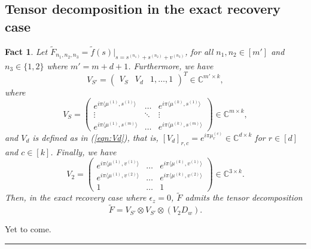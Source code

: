 \documentclass[11pt]{article}
\newtheorem{fact}[theorem]{Fact}
\newenvironment{proof}{{\bf Proof\quad}}{\hfill\rule{2mm}{2mm}}
\begin{document}
\subsection{Tensor decomposition in the exact recovery case}
\begin{fact}
    Let $\tilde{F}_{n_1,n_2,n_3}=\tilde{f}(s)\big|_{s=s^{(n_1)}+s^{(n_2)}+v^{(n_3)}}$, for all $n_1,n_2\in[m']$ and $n_3\in\{1,2\}$ where $m'=m+d+1$. Furthermore, we have 
    \begin{equation}
        V_{S'}=
        \begin{pmatrix}
            V_S&V_d&1,\ldots,1
        \end{pmatrix}^T\in\mathbb{C}^{m'\times k},
    \end{equation}
    where 
    \begin{equation}
        V_S=\begin{pmatrix}
            e^{i\pi\langle\mu^{(1)},s^{(1)}\rangle}&\ldots&e^{i\pi\langle\mu^{(k)},s^{(1)}\rangle}\\
            \vdots&\ddots&\vdots\\
            e^{i\pi\langle\mu^{(1)},s^{(m)}\rangle}&\ldots&e^{i\pi\langle\mu^{(k)},s^{(m)}\rangle}
        \end{pmatrix}\in\mathbb{C}^{m\times k},
    \end{equation}
    and $V_d$ is defined as in (\ref{eqn:Vd}), that is, $[V_d]_{r,c}=e^{i\pi\mu_r^{(c)}}\in\mathbb{C}^{d\times k}$ for $r\in[d]$ and $c\in[k]$. Finally, we have 
    \begin{equation}
        V_2=\begin{pmatrix}
            e^{i\pi\langle\mu^{(1)},v^{(1)}\rangle}&\ldots&e^{i\pi\langle\mu^{(k)},v^{(1)}\rangle}\\
            e^{i\pi\langle\mu^{(1)},v^{(2)}\rangle}&\ldots&e^{i\pi\langle\mu^{(k)},v^{(2)}\rangle}\\
            1&\ldots&1
        \end{pmatrix}\in\mathbb{C}^{3\times k}.
    \end{equation}
    Then, in the exact recovery case where $\epsilon_z=0$, $\tilde{F}$ admits the tensor decomposition $$\tilde{F}=V_{S'}\otimes V_{S'}\otimes(V_2D_w).$$
\end{fact}
\begin{proof}
    Yet to come.
\end{proof}
\end{document}
